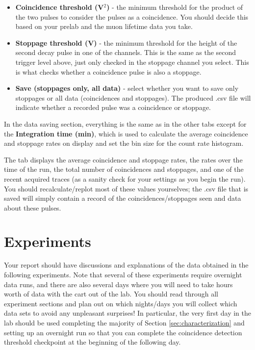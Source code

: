\documentclass{../lab}
\begin{document}
\begin{itemize}
    \item \textbf{Coincidence threshold (V$^2$)} - the minimum threshold for the product of the two pulses to consider the pulses as a coincidence. You should decide this based on your prelab and the muon lifetime data you take.
    \item \textbf{Stoppage threshold (V)} - the minimum threshold for the height of the second decay pulse in one of the channels. This is the same as the second trigger level above, just only checked in the stoppage channel you select. This is what checks whether a coincidence pulse is also a stoppage.
    \item \textbf{Save (stoppages only, all data)} - select whether you want to save only stoppages or all data (coincidences and stoppages). The produced .csv file will indicate whether a recorded pulse was a coincidence or stoppage.
\end{itemize}

In the data saving section, everything is the same as in the other tabs except for the \textbf{Integration time (min)}, which is used to calculate the average coincidence and stoppage rates on display and set the bin size for the count rate histogram.

The tab displays the average coincidence and stoppage rates, the rates over the time of the run, the total number of coincidences and stoppages, and one of the recent acquired traces (as a sanity check for your settings as you begin the run). You should recalculate/replot most of these values yourselves; the .csv file that is saved will simply contain a record of the coincidences/stoppages seen and data about these pulses.

\section{Experiments}

Your report should have discussions and explanations of the data obtained in the following experiments. Note that several of these experiments require overnight data runs, and there are also several days where you will need to take hours worth of data with the cart out of the lab. You should read through all experiment sections and plan out on which nights/days you will collect which data sets to avoid any unpleasant surprises! In particular, the very first day in the lab should be used completing the majority of Section \ref{sec:characterization} and setting up an overnight run so that you can complete the coincidence detection threshold checkpoint at the beginning of the following day.
\end{document}
